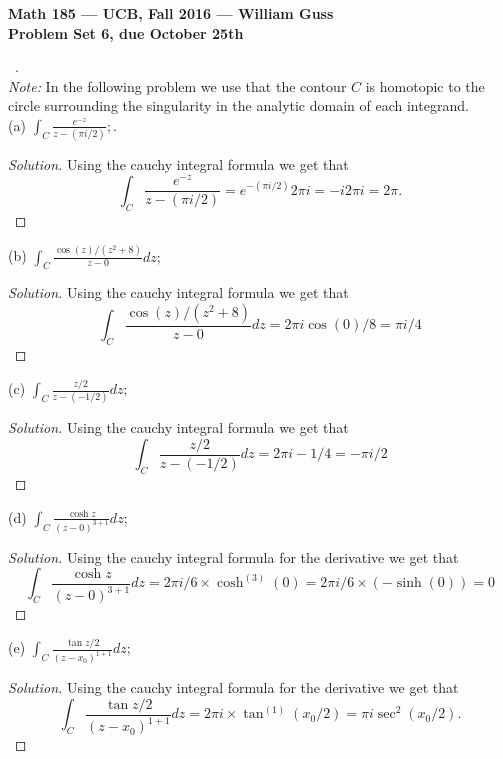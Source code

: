 \documentclass[11pt]{amsart}
\theoremstyle{definition}
\numberwithin{theorem}{section}
\numberwithin{definition}{section}
\numberwithin{equation}{section}
\newenvironment{solution}
  {\begin{proof}[Solution]}
  {\end{proof}}
\begin{document}
\begin{center}{\bf Math 185 --- UCB, Fall 2016 --- William Guss}
\\
{\bf Problem Set 6, due October 25th}
\end{center}

\medskip {}\ . \\

\emph{Note:} In the following problem we use that the contour $C$ is homotopic to the circle surrounding the
singularity in the analytic domain of each integrand. \\

(a) $\int_C \frac{e^{-z}}{z - (\pi i/ 2)};$.
\begin{solution}
 	Using the cauchy integral formula we get that
 	\begin{equation*}
 		\int_C \frac{e^{-z}}{z - (\pi i/ 2)} = e^{-(\pi i/2)} 2\pi i = -i 2 \pi i= 2\pi.	
 	\end{equation*}
 \end{solution} 
 (b) $\int_C \frac{\cos(z)/(z^2 + 8)}{z - 0} dz;$
 \begin{solution}
 	Using the cauchy integral formula we get that
 	\begin{equation*}
 	\int_C \frac{\cos(z)/(z^2 + 8)}{z - 0} dz = 2\pi i \cos(0)/8 = \pi i/4
 	\end{equation*}
 \end{solution}
  (c) $\int_C \frac{z/2}{z - (-1/2)} dz;$
 \begin{solution}
 	Using the cauchy integral formula we get that
 	\begin{equation*}
 	\int_C \frac{z/2}{z - (-1/2)} dz = 2\pi i -1/4 = -\pi i/2
 	\end{equation*}
 \end{solution}
  (d) $\int_C \frac{\cosh z}{(z- 0)^{3+1}} dz;$
 \begin{solution}
 	Using the cauchy integral formula for the derivative we get that
 	\begin{equation*}
 	\int_C \frac{\cosh z}{(z- 0)^{3+1}} dz = 2\pi i/6 \times \cosh^{(3)}(0) = 2\pi i/6 \times (-\sinh(0)) = 0
 	\end{equation*}
 \end{solution}
   (e) $\int_C \frac{\tan z/2}{(z- x_0)^{1+1}} dz;$
 \begin{solution}
 	Using the cauchy integral formula for the derivative we get that
 	\begin{equation*}
 	\int_C \frac{\tan z/2}{(z- x_0)^{1+1}} dz = 2\pi i \times \tan^{(1)}(x_0/2) = \pi i \sec^2(x_0/2).
 	\end{equation*}
 \end{solution}
\end{document}
